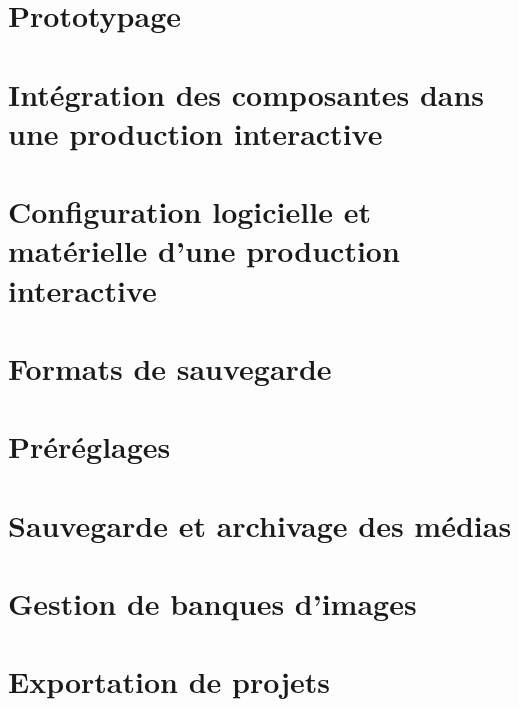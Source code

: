 \documentclass[
]{book}
\begin{document}
\hypertarget{prototypage}{%
\section{Prototypage}\label{prototypage}}

\hypertarget{intuxe9gration-des-composantes-dans-une-production-interactive}{%
\section{Intégration des composantes dans une production interactive}\label{intuxe9gration-des-composantes-dans-une-production-interactive}}

\hypertarget{configuration-logicielle-et-matuxe9rielle-dune-production-interactive}{%
\section{Configuration logicielle et matérielle d'une production interactive}\label{configuration-logicielle-et-matuxe9rielle-dune-production-interactive}}

\hypertarget{formats-de-sauvegarde}{%
\section{Formats de sauvegarde}\label{formats-de-sauvegarde}}

\hypertarget{pruxe9ruxe9glages}{%
\section{Préréglages}\label{pruxe9ruxe9glages}}

\hypertarget{sauvegarde-et-archivage-des-muxe9dias}{%
\section{Sauvegarde et archivage des médias}\label{sauvegarde-et-archivage-des-muxe9dias}}

\hypertarget{gestion-de-banques-dimages}{%
\section{Gestion de banques d'images}\label{gestion-de-banques-dimages}}

\hypertarget{exportation-de-projets}{%
\section{Exportation de projets}\label{exportation-de-projets}}
\end{document}
